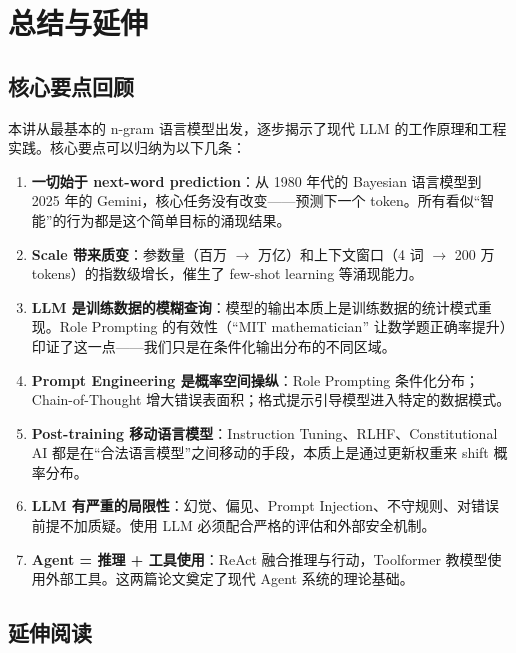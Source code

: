\section{总结与延伸}

\subsection{核心要点回顾}

本讲从最基本的 n-gram 语言模型出发，逐步揭示了现代 LLM 的工作原理和工程实践。核心要点可以归纳为以下几条：

\begin{enumerate}
    \item \textbf{一切始于 next-word prediction}：从 1980 年代的 Bayesian 语言模型到 2025 年的 Gemini，核心任务没有改变——预测下一个 token。所有看似``智能''的行为都是这个简单目标的涌现结果。

    \item \textbf{Scale 带来质变}：参数量（百万 $\rightarrow$ 万亿）和上下文窗口（4 词 $\rightarrow$ 200 万 tokens）的指数级增长，催生了 few-shot learning 等涌现能力。

    \item \textbf{LLM 是训练数据的模糊查询}：模型的输出本质上是训练数据的统计模式重现。Role Prompting 的有效性（``MIT mathematician'' 让数学题正确率提升）印证了这一点——我们只是在条件化输出分布的不同区域。

    \item \textbf{Prompt Engineering 是概率空间操纵}：Role Prompting 条件化分布；Chain-of-Thought 增大错误表面积；格式提示引导模型进入特定的数据模式。

    \item \textbf{Post-training 移动语言模型}：Instruction Tuning、RLHF、Constitutional AI 都是在``合法语言模型''之间移动的手段，本质上是通过更新权重来 shift 概率分布。

    \item \textbf{LLM 有严重的局限性}：幻觉、偏见、Prompt Injection、不守规则、对错误前提不加质疑。使用 LLM 必须配合严格的评估和外部安全机制。

    \item \textbf{Agent = 推理 + 工具使用}：ReAct 融合推理与行动，Toolformer 教模型使用外部工具。这两篇论文奠定了现代 Agent 系统的理论基础。
\end{enumerate}

\subsection{延伸阅读}

